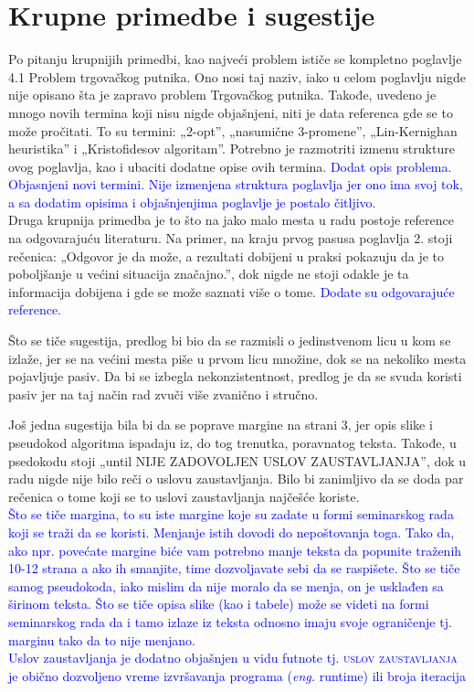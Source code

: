 \documentclass[a4paper]{report}
\newcommand{\odgovor}[1]{\textcolor{blue}{#1}}
\newcommand{\eng}[1]{(\textit{eng.} #1)}
\begin{document}
\section{Krupne primedbe i sugestije}
Po pitanju krupnijih primedbi, kao najveći problem ističe se kompletno poglavlje 4.1 Problem trgovačkog putnika. Ono nosi taj naziv, iako u celom poglavlju nigde nije opisano šta je zapravo problem Trgovačkog putnika. Takođe, uvedeno je mnogo novih termina koji nisu nigde objašnjeni, niti je data referenca gde se to može pročitati. To su termini: „2-opt”, „nasumične 3-promene”, „Lin-Kernighan heuristika” i „Kristofidesov algoritam”. Potrebno je razmotriti izmenu strukture ovog poglavlja, kao i ubaciti dodatne opise ovih termina.
\odgovor{Dodat opis problema. Objasnjeni novi termini. Nije izmenjena struktura poglavlja jer ono ima svoj tok, a sa dodatim opisima i objašnjenjima poglavlje je postalo čitljivo.\\}
Druga krupnija primedba je to što na jako malo mesta u radu postoje reference na odgovarajuću literaturu. Na primer, na kraju prvog pasusa poglavlja 2. stoji rečenica: „Odgovor je da može, a rezultati dobijeni u praksi pokazuju da je to poboljšanje u većini situacija značajno.”, dok nigde ne stoji odakle je ta informacija dobijena i gde se može saznati više o tome. \newline
\odgovor{Dodate su odgovarajuće reference.\\}


Što se tiče sugestija, predlog bi bio da se razmisli o jedinstvenom licu u kom se izlaže, jer se na većini mesta piše u prvom licu množine, dok se na nekoliko mesta pojavljuje pasiv. Da bi se izbegla nekonzistentnost, predlog je da se svuda koristi pasiv jer na taj način rad zvuči više zvanično i stručno. 

Još jedna sugestija bila bi da se poprave margine na strani 3, jer opis slike i pseudokod algoritma ispadaju iz, do tog trenutka, poravnatog teksta. Takođe, u psedokodu stoji „until NIJE ZADOVOLJEN USLOV ZAUSTAVLJANJA”, dok u radu nigde nije bilo reči o uslovu zaustavljanja. Bilo bi zanimljivo da se doda par rečenica o tome koji se to uslovi zaustavljanja najčešće koriste.\\
\odgovor{Što se tiče margina, to su iste margine koje su zadate u formi seminarskog rada koji se traži da se koristi. Menjanje istih dovodi do nepoštovanja toga. Tako da, ako npr. povećate margine biće vam potrebno manje teksta da popunite traženih 10-12 strana a ako ih smanjite, time dozvoljavate sebi da se raspišete. 
Što se tiče samog pseudokoda, iako mislim da nije moralo da se menja, on je usklađen sa širinom teksta. Što se tiče opisa slike (kao i tabele) može se videti na formi seminarskog rada da i tamo izlaze iz teksta odnosno imaju svoje ograničenje tj. marginu tako da to nije menjano.\\
Uslov zaustavljanja je dodatno objašnjen u vidu futnote tj. \textsc{uslov zaustavljanja} je obično dozvoljeno vreme izvršavanja programa \eng{runtime} ili broja iteracija\\}
\end{document}
